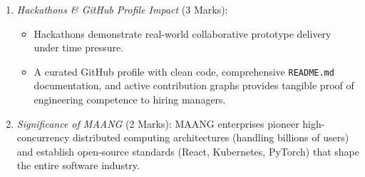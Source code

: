 \begin{solutionbox}
\begin{enumerate}[start=8]
\begin{enumerate}[label=(\alph*)]
        \item \textit{Hackathons \& GitHub Profile Impact} (3 Marks):
        \begin{itemize}
            \item Hackathons demonstrate real-world collaborative prototype delivery under time pressure.
            \item A curated GitHub profile with clean code, comprehensive \texttt{README.md} documentation, and active contribution graphs provides tangible proof of engineering competence to hiring managers.
        \end{itemize}

        \item \textit{Significance of MAANG} (2 Marks):
        MAANG enterprises pioneer high-concurrency distributed computing architectures (handling billions of users) and establish open-source standards (React, Kubernetes, PyTorch) that shape the entire software industry.
    \end{enumerate}
\end{enumerate}
\end{solutionbox}
